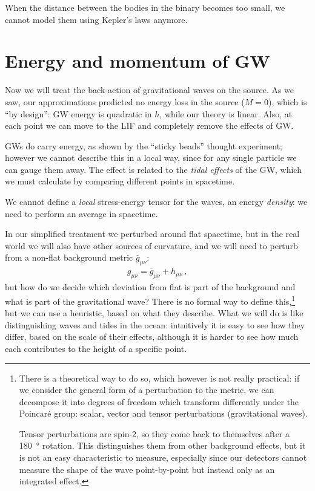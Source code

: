 \documentclass[main.tex]{subfiles}
\begin{document}
When the distance between the bodies in the binary becomes too small, we cannot model them using Kepler's laws anymore. 

\section{Energy and momentum of GW}

Now we will treat the back-action of gravitational waves on the source.
As we saw, our approximations predicted no energy loss in the source (\(\dot{M} = 0\)), which is ``by design'': GW energy is quadratic in \(h\), while our theory is linear. 
Also, at each point we can move to the LIF and completely remove the effects of GW. 
 
GWs do carry energy, as shown by the ``sticky beads'' thought experiment; however we cannot describe this in a local way, since for any single particle we can gauge them away.
The effect is related to the \emph{tidal effects} of the GW, which we must calculate by comparing different points in spacetime. 

We cannot define a \emph{local} stress-energy tensor for the waves, an energy \emph{density}: we need to perform an average in spacetime. 

In our simplified treatment we perturbed around flat spacetime, but in the real world we will also have other sources of curvature, and we will need to perturb from a non-flat background metric \(\overline{g}_{\mu \nu }\): 
%
\begin{align}
g_{\mu \nu } = \overline{g}_{\mu \nu } + h_{\mu \nu }
\,,
\end{align}
%
but how do we decide which deviation from flat is part of the background and what is part of the gravitational wave?
There is no formal way to define this,\footnote{There is a theoretical way to do so, which however is not really practical: if we consider the general form of a perturbation to the metric, we can decompose it into degrees of freedom which transform differently under the Poincaré group: scalar, vector and tensor perturbations (gravitational waves). 

Tensor perturbations are spin-2, so they come back to themselves after a \SI{180}{\degree} rotation. This distinguishes them from other background effects, but it is not an easy characteristic to measure, especially since our detectors cannot measure the shape of the wave point-by-point but instead only as an integrated effect.
}
but we can use a heuristic, based on what they describe. 
What we will do is like distinguishing waves and tides in the ocean: intuitively it is easy to see how they differ, based on the scale of their effects, although it is harder to see how much each contributes to the height of a specific point.
\end{document}
